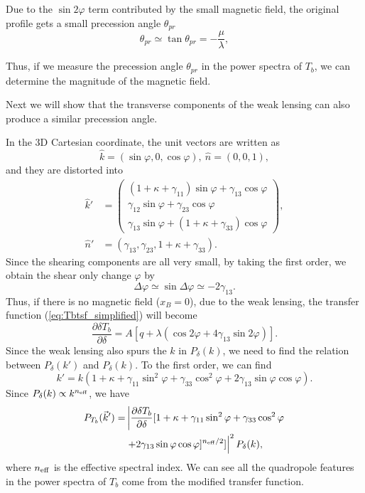 Due to the $\sin 2\varphi$ term contributed by the small magnetic field, the original profile gets a small precession angle $\theta_{pr}$
\begin{equation}
\theta_{pr}\simeq\tan\theta_{pr}=-\frac{\mu}{\lambda},
\end{equation}

Thus, if we measure the precession angle $\theta_{pr}$ in the power spectra of $T_b$, we can determine the magnitude of the magnetic field.

Next we will show that the transverse components of the weak lensing can also produce a similar precession angle.

In the 3D Cartesian coordinate, the unit vectors are written as
\begin{equation}
\hat{k}=(\sin\varphi,0,\cos\varphi),\ \hat{n}=(0,0,1),
\end{equation}
and they are distorted into
\begin{align}
\hat{k}'&=\left(\begin{array}{c}
(1+\kappa+\gamma_{11})\sin\varphi+\gamma_{13}\cos\varphi\\
\gamma_{12}\sin\varphi+\gamma_{23}\cos\varphi\\
\gamma_{13}\sin\varphi+(1+\kappa+\gamma_{33})\cos\varphi
\end{array}\right),\nonumber\\
\hat{n}'&=(\gamma_{13},\gamma_{23},1+\kappa+\gamma_{33}).
\end{align}
Since the shearing components are all very small, by taking the first order, we obtain the shear only change $\varphi$ by
\begin{equation}
\Delta\varphi\simeq\sin\Delta\varphi\simeq-2\gamma_{13}.
\end{equation}
Thus, if there is no magnetic field ($x_B=0$), due to the weak lensing, the transfer function (\ref{eq:Tbtsf_simplified}) will become
\begin{equation}
\frac{\partial\delta T_b}{\partial\delta}=A[q+\lambda(\cos 2\varphi+4\gamma_{13}\sin 2\varphi)].
\label{eq:Tbtsf_shear}
\end{equation}
Since the weak lensing also spurs the $k$ in $P_\delta(k)$, we need to find the relation between $P_\delta(k')$ and $P_\delta(k)$. To the first order, we can find
\begin{equation}
k'=k(1+\kappa+\gamma_{11}\sin^2\varphi+\gamma_{33}\cos^2\varphi+2\gamma_{13}\sin\varphi\cos\varphi).
\end{equation}
Since $P_\delta(k)\propto k^{n_{\rm eff}}$, we have
\begin{align}
P_{T_b}(\vec{k}')=&\left\vert\frac{\partial\delta T_b}{\partial\delta}[1+\kappa+\gamma_{11}\sin^2\varphi+\gamma_{33}\cos^2\varphi\right.\nonumber\\
&\left.+2\gamma_{13}\sin\varphi\cos\varphi]^{n_{\rm eff}/2}]\right\vert^2P_\delta(k),
\end{align}
where $n_{\rm eff}$ is the effective spectral index. We can see all the quadropole features in the power spectra of $T_b$ come from the modified transfer function.

